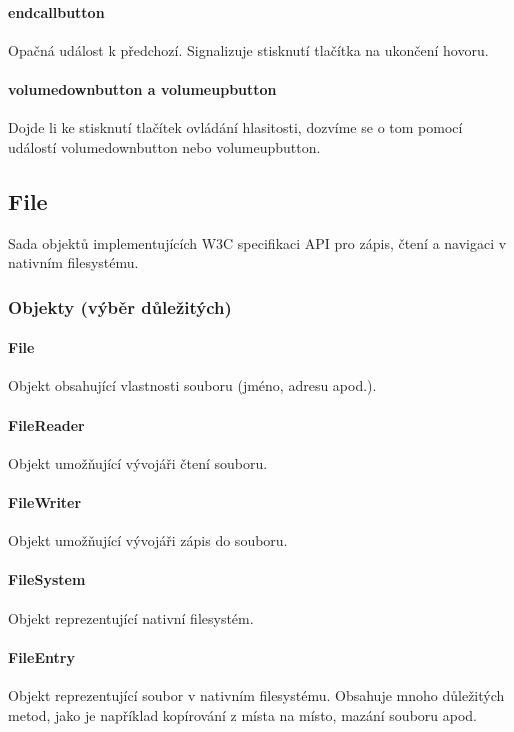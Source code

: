 \paragraph{endcallbutton}
Opačná událost k předchozí. Signalizuje stisknutí tlačítka na ukončení hovoru.

\paragraph{volumedownbutton a volumeupbutton}
Dojde li ke stisknutí tlačítek ovládání hlasitosti, dozvíme se o tom pomocí událostí volumedownbutton nebo volumeupbutton.

\subsection{File}
Sada objektů implementujících W3C specifikaci API pro zápis, čtení a navigaci v nativním filesystému.

\subsubsection{Objekty (výběr důležitých)}
\paragraph{File}
Objekt obsahující vlastnosti souboru (jméno, adresu apod.).

\paragraph{FileReader}
Objekt umožňující vývojáři čtení souboru.

\paragraph{FileWriter}
Objekt umožňující vývojáři zápis do souboru.

\paragraph{FileSystem}
Objekt reprezentující nativní filesystém.

\paragraph{FileEntry}
Objekt reprezentující soubor v nativním filesystému. Obsahuje mnoho důležitých metod, jako je například kopírování z místa na místo, mazání souboru apod.


